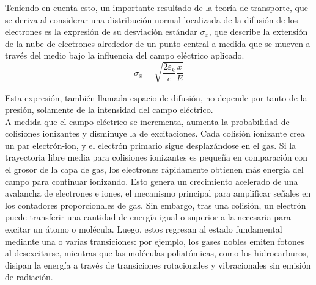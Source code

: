 \documentclass{article}
\begin{document}
\noindent Teniendo en cuenta esto, un importante resultado de la teoría de transporte, que se deriva al considerar una distribución normal localizada de la difusión de los electrones es la expresión de su desviación estándar $\sigma_x$, que describe la extensión de la nube de electrones alrededor de un punto central a medida que se mueven a través del medio bajo la influencia del campo eléctrico aplicado.
\begin{equation}
    \sigma_x=\sqrt{\frac{2 \varepsilon_k}{e} \frac{x}{E}}
\end{equation}

\noindent Esta expresión, también llamada espacio de difusión, no depende por tanto de la presión, solamente de la intensidad del campo eléctrico.\\

\noindent A medida que el campo eléctrico se incrementa, aumenta la probabilidad de colisiones ionizantes y disminuye la de excitaciones. Cada colisión ionizante crea un par electrón-ion, y el electrón primario sigue desplazándose en el gas. Si la trayectoria libre media para colisiones ionizantes es pequeña en comparación con el grosor de la capa de gas, los electrones rápidamente obtienen más energía del campo para continuar ionizando. Esto genera un crecimiento acelerado de una avalancha de electrones e iones, el mecanismo principal para amplificar señales en los contadores proporcionales de gas. Sin embargo, tras una colisión, un electrón puede transferir una cantidad de energía igual o superior a la necesaria para excitar un átomo o molécula. Luego, estos regresan al estado fundamental mediante una o varias transiciones: por ejemplo, los gases nobles emiten fotones al desexcitarse, mientras que las moléculas poliatómicas, como los hidrocarburos, disipan la energía a través de transiciones rotacionales y vibracionales sin emisión de radiación.\\
\end{document}
